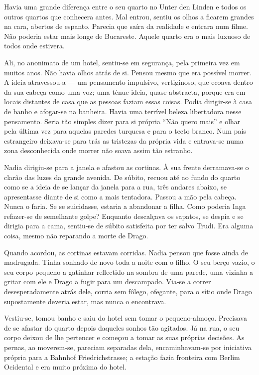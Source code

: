 Havia uma grande diferença entre o seu quarto no Unter den Linden e
todos os outros quartos que conhecera antes. Mal entrou, sentiu os olhos
a ficarem grandes na cara, abertos de espanto. Parecia que saíra da
realidade e entrara num filme. Não poderia estar mais longe de Bucareste. Aquele quarto era o mais luxuoso de todos onde estivera.

Ali, no anonimato de um hotel, sentiu-se em segurança, pela primeira vez
em muitos anos. Não havia olhos atrás de si. Pensou mesmo que era
possível morrer. A ideia atravessou-a --- um pensamento impulsivo,
vertiginoso, que ecoava dentro da sua cabeça como uma voz; uma ténue
ideia, quase abstracta, porque era em locais distantes de casa que as
pessoas faziam essas coisas. Podia dirigir-se à casa de banho e
afogar-se na banheira. Havia uma terrível beleza libertadora nesse
pensamento. Seria tão simples dizer para si própria ``Não quero mais'' e
olhar pela última vez para aquelas paredes turquesa e para o tecto
branco. Num país estrangeiro deixava-se para trás as tristezas da
própria vida e entrava-se numa zona desconhecida onde morrer não soava
assim tão estranho.

Nadia dirigiu-se para a janela e afastou as cortinas. À sua frente
derramava-se o clarão das luzes da grande avenida. De súbito, recuou até
ao fundo do quarto como se a ideia de se lançar da janela para a rua,
três andares abaixo, se apresentasse diante de si como a mais tentadora.
Passou a mão pela cabeça. Nunca o faria. Se se suicidasse, estaria a
abandonar a filha. Como poderia Inga refazer-se de semelhante golpe?
Enquanto descalçava os sapatos, se despia e se dirigia para a cama,
sentiu-se de súbito satisfeita por ter salvo Trudi. Era alguma coisa,
mesmo não reparando a morte de Drago.

Quando acordou, as cortinas estavam corridas. Nadia pensou que fosse
ainda de madrugada. Tinha sonhado de novo toda a noite com o filho. O
seu berço vazio, o seu corpo pequeno a gatinhar reflectido na sombra de
uma parede, uma vizinha a gritar com ele e Drago a fugir para um
descampado. Via-se a correr desesperadamente atrás dele, corria sem
fôlego, ofegante, para o sítio onde Drago supostamente deveria estar,
mas nunca o encontrava.

Vestiu-se, tomou banho e saiu do hotel sem tomar o pequeno-almoço.
Precisava de se afastar do quarto depois daqueles sonhos tão agitados.
Já na rua, o seu corpo deixou de lhe pertencer e começou a tomar as
suas próprias decisões. As pernas, ao moverem-se, pareciam separadas
dela, encaminhavam-se por iniciativa própria para a Bahnhof
Friedrichstrasse; a estação fazia fronteira com Berlim Ocidental e era
muito próxima do hotel.

